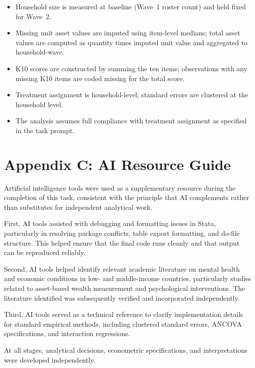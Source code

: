 \documentclass[12pt]{article}
\begin{document}
\begin{itemize}
  \item Household size is measured at baseline (Wave~1 roster count) and held fixed for Wave~2.
  \item Missing unit asset values are imputed using item-level medians; total asset values are computed as quantity times imputed unit value and aggregated to household-wave.
  \item K10 scores are constructed by summing the ten items; observations with any missing K10 items are coded missing for the total score.
  \item Treatment assignment is household-level; standard errors are clustered at the household level.
  \item The analysis assumes full compliance with treatment assignment as specified in the task prompt.
\end{itemize}


\section*{Appendix C: AI Resource Guide}

Artificial intelligence tools were used as a supplementary resource during the completion of this task, consistent with the principle that AI complements rather than substitutes for independent analytical work.

First, AI tools assisted with debugging and formatting issues in Stata, particularly in resolving package conflicts, table export formatting, and do-file structure. This helped ensure that the final code runs cleanly and that output can be reproduced reliably.

Second, AI tools helped identify relevant academic literature on mental health and economic conditions in low- and middle-income countries, particularly studies related to asset-based wealth measurement and psychological interventions. The literature identified was subsequently verified and incorporated independently.

Third, AI tools served as a technical reference to clarify implementation details for standard empirical methods, including clustered standard errors, ANCOVA specifications, and interaction regressions.

At all stages, analytical decisions, econometric specifications, and interpretations were developed independently.
\end{document}
